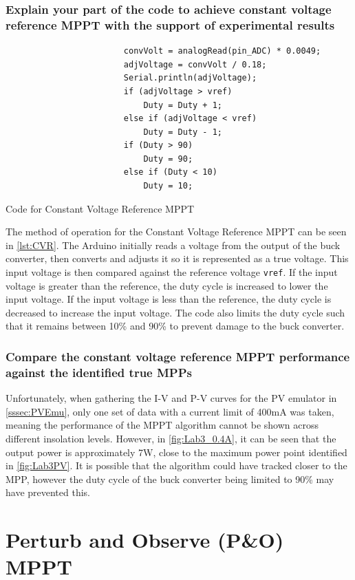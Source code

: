 \documentclass[]{article}
\begin{document}
			\subsubsection{Explain your part of the code to achieve constant voltage reference MPPT with the support of experimental results}
				\begin{listing}[H]
					\begin{verbatim}
						convVolt = analogRead(pin_ADC) * 0.0049;
						adjVoltage = convVolt / 0.18;
						Serial.println(adjVoltage);
						if (adjVoltage > vref)
							Duty = Duty + 1;
						else if (adjVoltage < vref)
							Duty = Duty - 1;
						if (Duty > 90)
							Duty = 90;
						else if (Duty < 10)
							Duty = 10;
					\end{verbatim}
					\caption{Code for Constant Voltage Reference MPPT}
					\label{lst:CVR}
				\end{listing}
				The method of operation for the Constant Voltage Reference MPPT can be seen in \cref{lst:CVR}. The Arduino initially reads a voltage from the output of the buck converter, then converts and adjusts it so it is represented as a true voltage. This input voltage is then compared against the reference voltage \texttt{vref}. If the input voltage is greater than the reference, the duty cycle is increased to lower the input voltage. If the input voltage is less than the reference, the duty cycle is decreased to increase the input voltage. The code also limits the duty cycle such that it remains between 10\% and 90\% to prevent damage to the buck converter.
				
 			\subsubsection{Compare the constant voltage reference MPPT performance against the identified true MPPs}
	 			Unfortunately, when gathering the I-V and P-V curves for the PV emulator in \cref{sssec:PVEmu}, only one set of data with a current limit of 400mA was taken, meaning the performance of the MPPT algorithm cannot be shown across different insolation levels. However, in \cref{fig:Lab3_0.4A}, it can be seen that the output power is approximately 7W, close to the maximum power point identified in \cref{fig:Lab3PV}. It is possible that the algorithm could have tracked closer to the MPP, however the duty cycle of the buck converter being limited to 90\% may have prevented this.
	\newpage
 	\section{Perturb and Observe (P\&O) MPPT}
\end{document}
